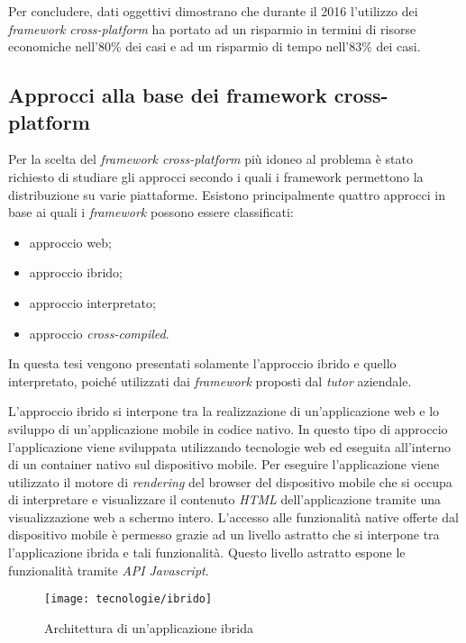 Per concludere, dati oggettivi dimostrano che durante il 2016 l'utilizzo dei \textit{framework cross-platform} ha portato ad un risparmio in termini di risorse economiche nell'80\% dei casi e ad un risparmio di tempo nell'83\% dei casi.

\subsection{Approcci alla base dei framework cross-platform}

Per la scelta del \textit{framework cross-platform} più idoneo al problema è stato richiesto di studiare gli approcci secondo i quali i framework permettono la distribuzione su varie piattaforme. Esistono principalmente quattro approcci in base ai quali i \textit{framework} possono essere classificati:
\begin{itemize}
	\item approccio web;
	\item approccio ibrido;
	\item approccio interpretato;
	\item approccio \textit{cross-compiled}.
\end{itemize}

In questa tesi vengono presentati solamente l'approccio ibrido e quello interpretato, poiché utilizzati dai \textit{framework} proposti dal \textit{tutor} aziendale.

L'approccio ibrido si interpone tra la realizzazione di un'applicazione web e lo sviluppo di un'applicazione mobile in codice nativo. In questo tipo di approccio l'applicazione viene sviluppata utilizzando tecnologie web ed eseguita all'interno di un container nativo sul dispositivo mobile. Per eseguire l'applicazione viene utilizzato il motore di \textit{rendering} del browser del dispositivo mobile che si occupa di interpretare e visualizzare il contenuto \textit{HTML} dell'applicazione tramite una visualizzazione web a schermo intero. L'accesso alle funzionalità native offerte dal dispositivo mobile è permesso grazie ad un livello astratto che si interpone tra l'applicazione ibrida e tali funzionalità. Questo livello astratto espone le funzionalità tramite \textit{API} \textit{Javascript}. 

\begin{figure}[!h] 
    \centering 
    \texttt{[image: tecnologie/ibrido]} 
    \caption{Architettura di un'applicazione ibrida}
\end{figure}

